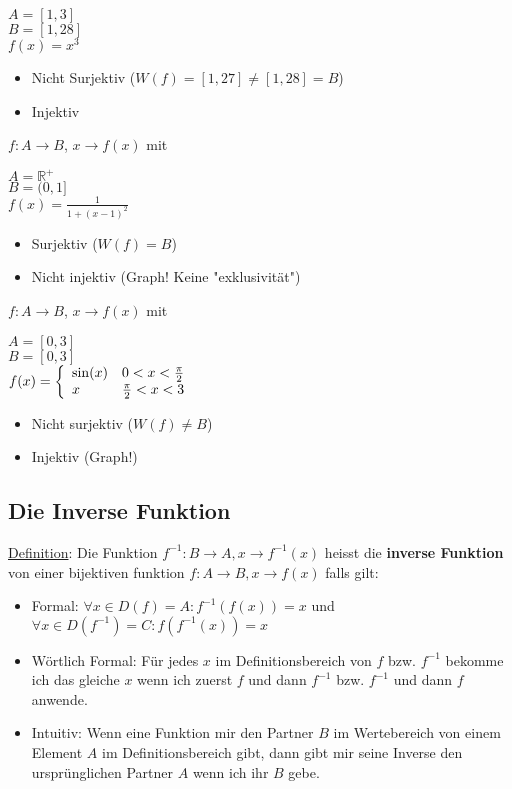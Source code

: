 \documentclass[11pt]{article} %
\begin{document}
$A= [1,3]$\\
$B = [1,28]$\\

$f(x) = x^3$\\

\begin{itemize}
\item Nicht Surjektiv ($W(f) = [1,27] \neq [1,28] = B$)
\item Injektiv
\end{itemize}

$f: A \rightarrow B$, $x \rightarrow f(x)$ mit

$A= \mathbb{R}^+$\\
$B = (0,1]$\\

$f(x) = \frac{1}{1+(x-1)^2}$\\

\begin{itemize}
\item Surjektiv ($W(f) = B$)
\item Nicht injektiv (Graph! Keine "exklusivität")
\end{itemize}

$f: A \rightarrow B$, $x \rightarrow f(x)$ mit

$A=[0,3]$\\
$B = [0,3]$\\

$f(x) = \left \{ 
\begin{array}{l  l}
	\sin(x) & 0<x<\frac{\pi}{2}\\
	x & \frac{\pi}{2}<x<3\\
\end{array} \right.$ \\

\begin{itemize}
\item Nicht surjektiv ($W(f) \neq B$)
\item Injektiv (Graph!)
\end{itemize}

\subsection{Die Inverse Funktion}
\underline{Definition}: Die Funktion $f^{-1}: B \rightarrow A, x \rightarrow f^{-1}(x)$ heisst die {\bf inverse Funktion} von einer bijektiven funktion $f: A \rightarrow B, x \rightarrow f(x)$ falls gilt:
\begin{itemize}
\item Formal: $\forall x \in D(f) = A: f^{-1}(f(x))=x$ und $\forall x \in D(f^{-1}) = C: f(f^{-1}(x))=x$
\item Wörtlich Formal: Für jedes $x$ im Definitionsbereich von $f$ bzw. $f^{-1}$ bekomme ich das gleiche $x$ wenn ich zuerst $f$ und dann $f^{-1}$  bzw. $f^{-1}$ und dann $f$ anwende.
\item Intuitiv: Wenn eine Funktion mir den Partner $B$ im Wertebereich von einem Element $A$ im Definitionsbereich gibt, dann gibt mir seine Inverse den ursprünglichen Partner $A$ wenn ich ihr $B$ gebe.\\
\end{itemize}
\end{document}
